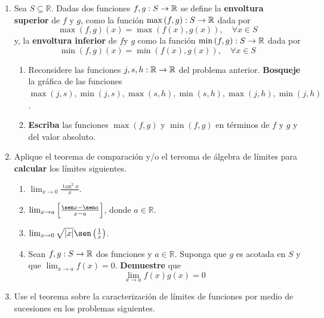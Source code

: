 \documentclass[12pt]{article}
\begin{document}
\begin{enumerate}
\begin{enumerate}
    \end{enumerate}
    \item Sea $S\subseteq\mathbb{R}$. Dadas dos funciones $f,g:S\rightarrow\mathbb{R}$ se define la \textbf{envoltura superior} de $f$ y $g$, como la función $\max\left(f,g\right):S\rightarrow\mathbb{R}$ dada por
    \begin{equation*}
        \max\left(f,g\right)(x)=\max\left(f(x),g(x)\right),\quad\forall x\in S
    \end{equation*}
    y, la \textbf{envoltura inferior} de $f$y $g$ como la función $\min\left(f,g\right):S\rightarrow\mathbb{R}$ dada por
    \begin{equation*}
        \min\left(f,g\right)(x)=\min\left(f(x),g(x)\right),\quad\forall x\in S
    \end{equation*}
    \begin{enumerate}
        \item Reconsidere las funciones $j,s,h:\mathbb{R}\rightarrow\mathbb{R}$ del problema anterior. \textbf{Bosqueje} la gráfica de las funciones $\max(j,s),\min(j,s),\max(s,h),\min(s,h),\max(j,h),\min(j,h)$.
        \item \textbf{Escriba} las funciones $\max(f,g)$ y $\min(f,g)$ en términos de $f$ y $g$ y del valor absoluto.
    \end{enumerate}
    \item Aplique el teorema de comparación y/o el tereoma de álgebra de límites para \textbf{calcular} los límites siguientes.
    \begin{enumerate}
        \item $\lim_{x\rightarrow0}\frac{\tan^2x}{x}$.
        \item $\lim_{x\rightarrow a}\left[\frac{\sen x-\sen a}{x-a} \right]$, donde $a\in\mathbb{R}$.
        \item $\lim_{x\rightarrow0}\sqrt{\abs{x}}\sen\left(\frac{1}{x}\right)$.
        \item Sean $f,g:S\rightarrow\mathbb{R}$ dos funciones y $a\in\mathbb{R}$. Suponga que $g$ es acotada en $S$ y que $\lim_{x\rightarrow a}f(x)=0$. \textbf{Demuestre} que
        \begin{equation*}
            \lim_{x\rightarrow a}f(x)g(x)=0
        \end{equation*}
    \end{enumerate}
    \item Use el teorema sobre la caracterización de límites de funciones por medio de sucesiones en los problemas siguientes.
    \begin{enumerate}

\end{enumerate}
\end{enumerate}
\end{document}

